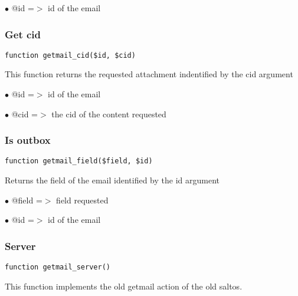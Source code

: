 \documentclass[a4paper]{article}
\begin{document}
\begin{compactitem}
\item[\color{myblue}$\bullet$] @id =$>$ id of the email
\end{compactitem}

\hypertarget{toc98}{}
\subsubsection{Get cid}

\begin{lstlisting}
function getmail_cid($id, $cid)
\end{lstlisting}

This function returns the requested attachment indentified by the cid argument

\begin{compactitem}
\item[\color{myblue}$\bullet$] @id  =$>$ id of the email
\item[\color{myblue}$\bullet$] @cid =$>$ the cid of the content requested
\end{compactitem}

\hypertarget{toc99}{}
\subsubsection{Is outbox}

\begin{lstlisting}
function getmail_field($field, $id)
\end{lstlisting}

Returns the field of the email identified by the id argument

\begin{compactitem}
\item[\color{myblue}$\bullet$] @field =$>$ field requested
\item[\color{myblue}$\bullet$] @id    =$>$ id of the email
\end{compactitem}

\hypertarget{toc100}{}
\subsubsection{Server}

\begin{lstlisting}
function getmail_server()
\end{lstlisting}

This function implements the old getmail action of the old saltos.
\end{document}
